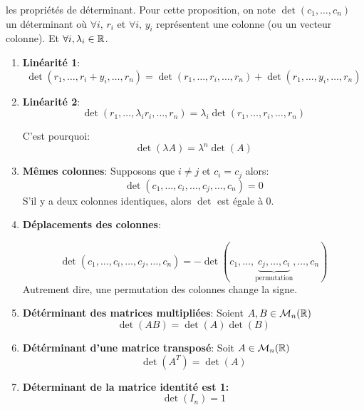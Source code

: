 \begin{prop} les propriétés de déterminant.
    Pour cette proposition, on note $\det(c_1, \ldots, c_n)$ un déterminant où $\forall i, \, r_i$ et $\forall i, \, y_i$ représentent une colonne (ou un vecteur colonne). Et $\forall i, \lambda_i \in \mathbb{R}$.
    \begin{enumerate}
        \item \textbf{Linéarité 1}:
            \[
            \det(r_1, \ldots, r_i + y_i, \ldots, r_n) = \det(r_1, \ldots, r_i, \ldots, r_n) + \det(r_1, \ldots, y_i, \ldots, r_n)
            \] 
        \item \textbf{Linéarité 2}:
            \[
            \det(r_1, \ldots, \lambda_ir_i, \ldots, r_n) = \lambda_i\det(r_1, \ldots, r_i, \ldots, r_n) 
            \] 
            \begin{note}
               C'est pourquoi:
               \[
               \det(\lambda A) = \lambda^n\det(A)
               \] 
            \end{note}
        \item \textbf{Mêmes colonnes}: Supposons que $i \neq j$ et $c_i = c_j$ alors:
             \[
            \det(c_1, \ldots, c_i, \ldots, c_j, \ldots, c_n) = 0
            \] 
            S'il y a deux colonnes identiques, alors $\det$ est égale à 0.
        \item \textbf{Déplacements des colonnes}:
            
\[
    \det(c_1, \ldots, c_i, \ldots, c_j, \ldots, c_n) 
    = -\det(c_1, \ldots, 
    \underbrace{c_j , \ldots, 
    c_i}_{\text{permutation}}, \ldots, c_n)
\]
Autrement dire, une permutation des colonnes change la signe.

\item \textbf{Détérminant des matrices multipliées}: Soient $A, B \in \mathcal{M}_n(\mathbb{R})$
    \[
        \det(AB) = \det(A)\det(B) 
    \] 

\item \textbf{Détérminant d'une matrice transposé}: Soit $A \in \mathcal{M}_n(\mathbb{R})$
    \[
        \det(A^{T}) = \det(A)
    \] 

\item \textbf{Déterminant de la matrice identité est 1:}
    \[
    \det(I_n) = 1
    \] 

\end{enumerate}
\end{prop}
